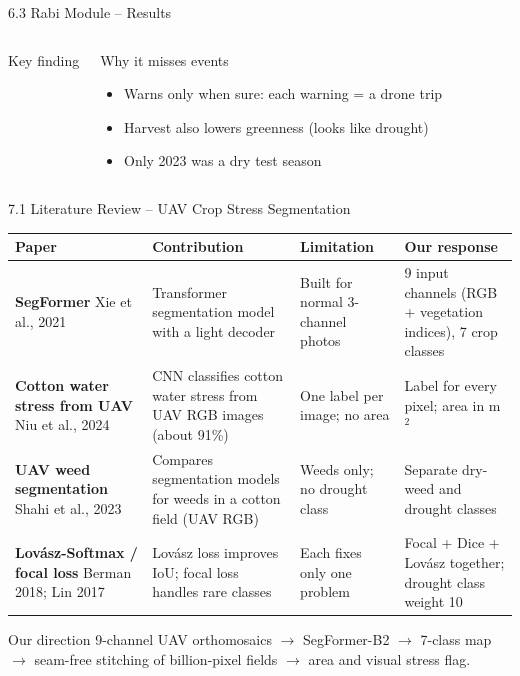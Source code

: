 \documentclass[aspectratio=169,10pt]{beamer}
\begin{document}
\begin{frame}{6.3 Rabi Module -- Results}
\begin{columns}[T,onlytextwidth]
\begin{keycard}{Key finding}
\end{keycard}
\begin{warncard}{Why it misses events}
\scriptsize\raggedright
\begin{itemize}
\item Warns only when sure: each warning = a drone trip
\item Harvest also lowers greenness (looks like drought)
\item Only 2023 was a dry test season
\end{itemize}
\end{warncard}
\end{columns}
\end{frame}

\begin{frame}{7.1 Literature Review -- UAV Crop Stress Segmentation}
\footnotesize
\renewcommand{\arraystretch}{1.22}
\begin{tabularx}{\textwidth}{|>{\raggedright\arraybackslash}p{3.3cm}|Y|Y|Y|}
\hline
\textbf{Paper} & \textbf{Contribution} & \textbf{Limitation} & \textbf{Our response} \\ \hline
\textbf{SegFormer} \newline Xie et al., 2021 & Transformer segmentation model with a light decoder & Built for normal 3-channel photos & 9 input channels (RGB + vegetation indices), 7 crop classes \\ \hline
\textbf{Cotton water stress from UAV} \newline Niu et al., 2024 & CNN classifies cotton water stress from UAV RGB images (about 91\%) & One label per image; no area & Label for every pixel; area in m$^2$ \\ \hline
\textbf{UAV weed segmentation} \newline Shahi et al., 2023 & Compares segmentation models for weeds in a cotton field (UAV RGB) & Weeds only; no drought class & Separate dry-weed and drought classes \\ \hline
\textbf{Lov\'asz-Softmax / focal loss} \newline Berman 2018; Lin 2017 & Lov\'asz loss improves IoU; focal loss handles rare classes & Each fixes only one problem & Focal + Dice + Lov\'asz together; drought class weight 10 \\ \hline
\end{tabularx}
\begin{card}{Our direction}
\footnotesize 9-channel UAV orthomosaics $\rightarrow$ SegFormer-B2 $\rightarrow$ 7-class map $\rightarrow$ seam-free stitching of billion-pixel fields $\rightarrow$ area and visual stress flag.
\end{card}
\end{frame}
\end{document}
